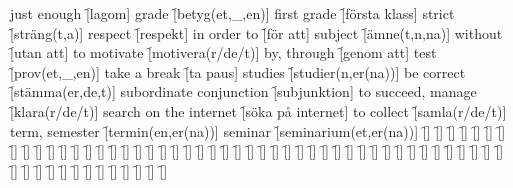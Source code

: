 \begin{questions}
    \begin{multicols}{2}
        \raggedcolumns
        \question just enough \f[lagom]
        \question grade \f[betyg(et,\_,en)]
        \question first grade \f[första klass]
        \question strict \f[sträng(t,a)]
        \question respect \f[respekt]
        \question in order to \f[för att]
        \question subject \f[ämne(t,n,na)]
        \question without \f[utan att]
        \question to motivate \f[motivera(r/de/t)]
        \question by, through \f[genom att]
        \question test \f[prov(et,\_,en)]
        \question take a break \f[ta paus]
        \question studies \f[studier(n,er(na))]
        \question be correct \f[stämma(er,de,t)]
        \question subordinate conjunction \f[subjunktion]
        \question to succeed, manage \f[klara(r/de/t)]
        \question search on the internet \f[söka på internet]
        \question to collect \f[samla(r/de/t)]
        \question term, semester \f[termin(en,er(na))]
        \question seminar \f[seminarium(et,er(na))]
        \question  \f[]
        \question  \f[]
        \question  \f[]
        \question  \f[]
        \question  \f[]
        \question  \f[]
        \question  \f[]
        \question  \f[]
        \question  \f[]
        \question  \f[]
        \question  \f[]
        \question  \f[]
        \question  \f[]
        \question  \f[]
        \question  \f[]
        \question  \f[]
        \question  \f[]
        \question  \f[]
        \question  \f[]
        \question  \f[]
        \question  \f[]
        \question  \f[]
        \question  \f[]
        \question  \f[]
        \question  \f[]
        \question  \f[]
        \question  \f[]
        \question  \f[]
        \question  \f[]
        \question  \f[]
        \question  \f[]
        \question  \f[]
        \question  \f[]
        \question  \f[]
        \question  \f[]
        \question  \f[]
        \question  \f[]
        \question  \f[]
        \question  \f[]
        \question  \f[]
        \question  \f[]
        \question  \f[]
        \question  \f[]
        \question  \f[]
        \question  \f[]
        \question  \f[]
        \question  \f[]
        \question  \f[]
        \question  \f[]
        \question  \f[]
        \question  \f[]
        \question  \f[]
        \question  \f[]
        \question  \f[]
        \question  \f[]
        \question  \f[]
        \question  \f[]
        \question  \f[]
        \question  \f[]
        \question  \f[]
    \end{multicols}
\end{questions}
